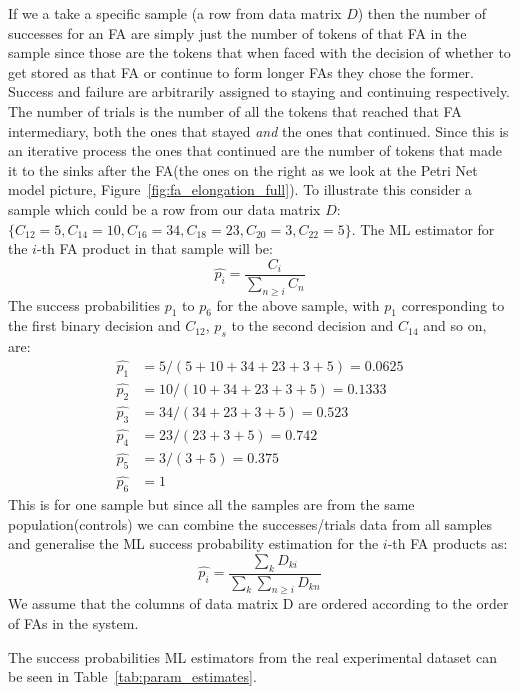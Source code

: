 If we a take a specific sample (a row from data matrix $D$) then the
number of successes for an FA are simply just the number of tokens of
that FA in the sample since those are the tokens that when faced with
the decision of whether to get stored as that FA or continue to form
longer FAs they chose the former. Success and failure are arbitrarily
assigned to staying and continuing respectively. The number of trials
is the number of all the tokens that reached that FA intermediary, both
the ones that stayed \textit{and} the ones that continued. Since this
is an iterative process the ones that continued are the number of
tokens that made it to the sinks after the FA(the ones on the right as
we look at the Petri Net model picture,
Figure~\ref{fig:fa_elongation_full}). To illustrate this consider a
sample which could be a row from our data matrix $D$: $\{C_{12}=5,
C_{14}=10, C_{16}=34, C_{18}=23, C_{20}=3, C_{22}=5\}$. The ML
estimator for the $i$-th FA product in that sample will be:
\begin{equation*}
\hat{p_i} = \frac{C_i}{\sum_{n \geq i} C_n}
\end{equation*}
The success probabilities $p_1$ to $p_6$ for the above sample, with $p_1$ corresponding to
the first binary decision and $C_{12}$, $p_s$ to the second decision
and $C_{14}$ and so on, are:
\begin{align*}
\hat{p_1} & = 5/(5+10+34+23+3+5) = 0.0625\\
\hat{p_2} & = 10 / (10+34+23+3+5) = 0.1333\\
\hat{p_3} & = 34 / (34+23+3+5) = 0.523\\
\hat{p_4} & = 23 / (23+3+5) = 0.742\\
\hat{p_5} & = 3 / (3+5) = 0.375\\
\hat{p_6} & = 1
\end{align*}
This is for one sample but since all the samples are from the same
population(controls) we can combine the successes/trials data from all
samples and generalise the ML success probability estimation for the
$i$-th FA products as:
\begin{equation*}
\hat{p_i} = \frac{\sum_k D_{ki}}{\sum_k \sum_{n\geq i} D_{kn}}
\end{equation*}
We assume that the columns of data matrix D are ordered according to
the order of FAs in the system.

The success probabilities ML estimators from the real experimental dataset
can be seen in Table~\ref{tab:param_estimates}.

